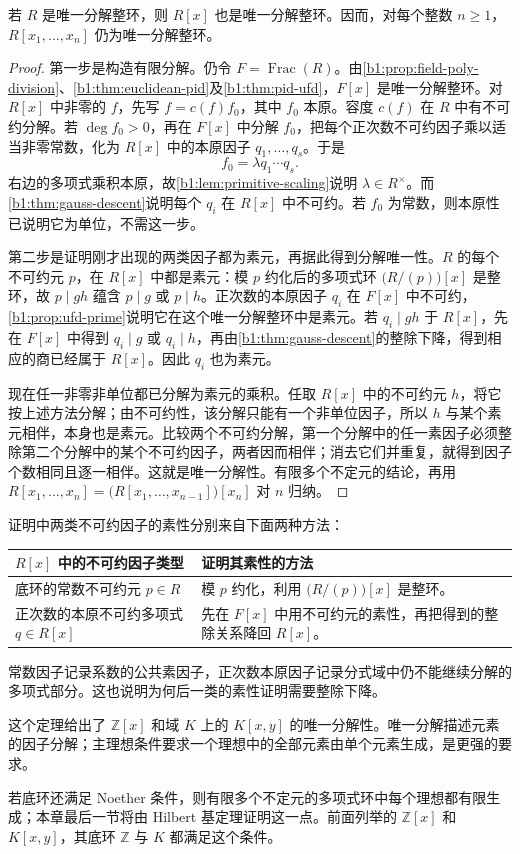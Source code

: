 \begin{theorem}\label{b1:thm:polynomial-ufd}
	若 \(R\) 是唯一分解整环，则 \(R[x]\) 也是唯一分解整环。因而，对每个整数 \(n\geq1\)，\(R[x_1,\ldots,x_n]\) 仍为唯一分解整环。
\end{theorem}
\begin{proof}
	第一步是构造有限分解。仍令 \(F=\operatorname{Frac}(R)\)。由\cref{b1:prop:field-poly-division}、\cref{b1:thm:euclidean-pid}及\cref{b1:thm:pid-ufd}，\(F[x]\) 是唯一分解整环。对 \(R[x]\) 中非零的 \(f\)，先写 \(f=c(f)f_0\)，其中 \(f_0\) 本原。容度 \(c(f)\) 在 \(R\) 中有不可约分解。若 \(\deg f_0>0\)，再在 \(F[x]\) 中分解 \(f_0\)，把每个正次数不可约因子乘以适当非零常数，化为 \(R[x]\) 中的本原因子 \(q_1,\ldots,q_s\)。于是
	\[
		f_0=\lambda q_1\cdots q_s.
	\]
	右边的多项式乘积本原，故\cref{b1:lem:primitive-scaling}说明 \(\lambda\in R^\times\)。而\cref{b1:thm:gauss-descent}说明每个 \(q_i\) 在 \(R[x]\) 中不可约。若 \(f_0\) 为常数，则本原性已说明它为单位，不需这一步。

	第二步是证明刚才出现的两类因子都为素元，再据此得到分解唯一性。\(R\) 的每个不可约元 \(p\)，在 \(R[x]\) 中都是素元：模 \(p\) 约化后的多项式环 \(\bigl(R/(p)\bigr)[x]\) 是整环，故 \(p\mid gh\) 蕴含 \(p\mid g\) 或 \(p\mid h\)。正次数的本原因子 \(q_i\) 在 \(F[x]\) 中不可约，\cref{b1:prop:ufd-prime}说明它在这个唯一分解整环中是素元。若 \(q_i\mid gh\) 于 \(R[x]\)，先在 \(F[x]\) 中得到 \(q_i\mid g\) 或 \(q_i\mid h\)，再由\cref{b1:thm:gauss-descent}的整除下降，得到相应的商已经属于 \(R[x]\)。因此 \(q_i\) 也为素元。

	现在任一非零非单位都已分解为素元的乘积。任取 \(R[x]\) 中的不可约元 \(h\)，将它按上述方法分解；由不可约性，该分解只能有一个非单位因子，所以 \(h\) 与某个素元相伴，本身也是素元。比较两个不可约分解，第一个分解中的任一素因子必须整除第二个分解中的某个不可约因子，两者因而相伴；消去它们并重复，就得到因子个数相同且逐一相伴。这就是唯一分解性。有限多个不定元的结论，再用 \(R[x_1,\ldots,x_n]=\bigl(R[x_1,\ldots,x_{n-1}]\bigr)[x_n]\) 对 \(n\) 归纳。
\end{proof}

证明中两类不可约因子的素性分别来自下面两种方法：
\begin{center}
	\begin{tabularx}{\textwidth}{@{}XX@{}}
		\toprule
		\(R[x]\) 中的不可约因子类型 & 证明其素性的方法 \\
		\midrule
		底环的常数不可约元 \(p\in R\) & 模 \(p\) 约化，利用 \(\bigl(R/(p)\bigr)[x]\) 是整环。 \\
		正次数的本原不可约多项式 \(q\in R[x]\) & 先在 \(F[x]\) 中用不可约元的素性，再把得到的整除关系降回 \(R[x]\)。 \\
		\bottomrule
	\end{tabularx}
\end{center}
常数因子记录系数的公共素因子，正次数本原因子记录分式域中仍不能继续分解的多项式部分。这也说明为何后一类的素性证明需要整除下降。

\ProseParagraphBreak
这个定理给出了 \(\mathbb Z[x]\) 和域 \(K\) 上的 \(K[x,y]\) 的唯一分解性。唯一分解描述元素的因子分解；主理想条件要求一个理想中的全部元素由单个元素生成，是更强的要求。

\ProseParagraphBreak
若底环还满足 Noether 条件，则有限多个不定元的多项式环中每个理想都有限生成；本章最后一节将由 Hilbert 基定理证明这一点。前面列举的 \(\mathbb Z[x]\) 和 \(K[x,y]\)，其底环 \(\mathbb Z\) 与 \(K\) 都满足这个条件。
